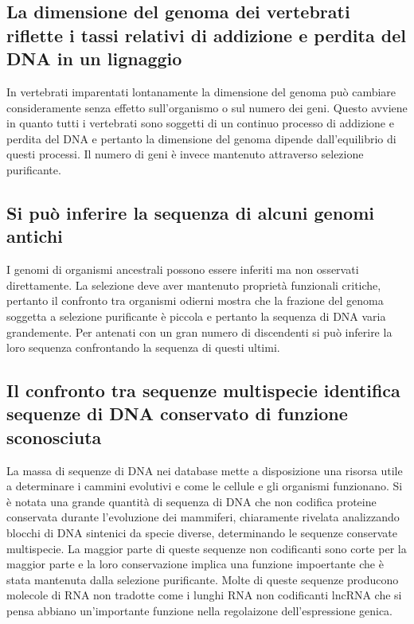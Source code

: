 \subsection{La dimensione del genoma dei vertebrati riflette i tassi relativi di addizione e perdita del DNA in un lignaggio}
In vertebrati imparentati lontanamente la dimensione del genoma pu\`o cambiare consideramente senza effetto sull'organismo o sul numero dei geni. Questo avviene in quanto tutti i 
vertebrati sono soggetti di un continuo processo di addizione e perdita del DNA e pertanto la dimensione del genoma dipende dall'equilibrio di questi processi. Il numero di geni \`e 
invece mantenuto attraverso selezione purificante.
\subsection{Si pu\`o inferire la sequenza di alcuni genomi antichi}
I genomi di organismi ancestrali possono essere inferiti ma non osservati direttamente. La selezione deve aver mantenuto propriet\`a funzionali critiche, pertanto il confronto tra 
organismi odierni mostra che la frazione del genoma soggetta a selezione purificante \`e piccola e pertanto la sequenza di DNA varia grandemente. Per antenati con un gran numero di 
discendenti si pu\`o inferire la loro sequenza confrontando la sequenza di questi ultimi. 
\subsection{Il confronto tra sequenze multispecie identifica sequenze di DNA conservato di funzione sconosciuta}
La massa di sequenze di DNA nei database mette a disposizione una risorsa utile a determinare i cammini evolutivi e come le cellule e gli organismi funzionano. Si \`e notata una grande
quantit\`a di sequenza di DNA che non codifica proteine conservata durante l'evoluzione dei mammiferi, chiaramente rivelata analizzando blocchi di DNA sintenici da specie diverse, 
determinando le sequenze conservate multispecie. La maggior parte di queste sequenze non codificanti sono corte per la maggior parte e la loro conservazione implica una funzione 
impoertante che \`e stata mantenuta dalla selezione purificante. Molte di queste sequenze producono molecole di RNA non tradotte come i lunghi RNA non codificanti lncRNA che si pensa
abbiano un'importante funzione nella regolaizone dell'espressione genica. 
